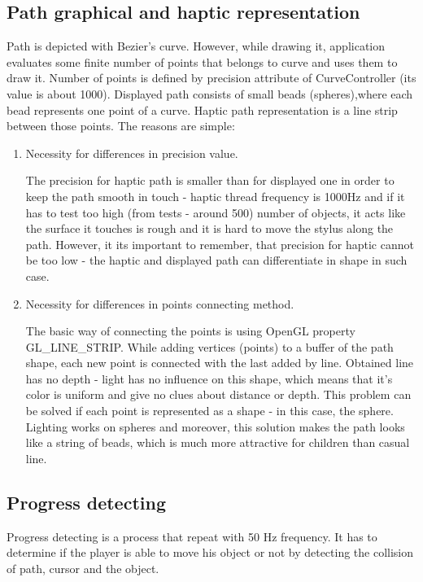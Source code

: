 \subsection{Path graphical and haptic representation}
\label{path_representation}
Path is depicted with Bezier's curve. However, while drawing it, application evaluates some finite number of points that belongs to curve and uses them to draw it. Number of points is defined by precision attribute of CurveController (its value is about 1000).
Displayed path consists of small beads (spheres),where each bead represents one point of a curve. Haptic path representation is a line strip between those points. The reasons are simple:
\begin{enumerate} [noitemsep]
\item {Necessity for differences in precision value.}

The precision for haptic path is smaller than for displayed one in order to keep the path smooth in touch - haptic thread frequency is 1000Hz and if it has to test too high (from tests - around 500) number of objects, it acts like the surface it touches is rough and it is hard to move the stylus along the path. However, it its important to remember, that precision for haptic cannot be too low - the haptic and displayed path can differentiate in shape in such case.

\item {Necessity for differences in points connecting method.}

The basic way of connecting the points is using OpenGL property GL\_LINE\_STRIP. While adding vertices (points) to a buffer of the path shape, each new point is connected with the last added by line. Obtained line has no depth - light has no influence on this shape, which means that it's color is uniform and give no clues about distance or depth. This problem can be solved if each point is represented as a shape - in this case, the sphere. Lighting works on spheres and moreover, this solution makes the path looks like a string of beads, which is much more attractive for children than casual line.

\end{enumerate} 

\subsection{Progress detecting}

Progress detecting is a process that repeat with 50 Hz frequency. It has to determine if the player is able to move his object or not by detecting the collision of path, cursor and the object. 

